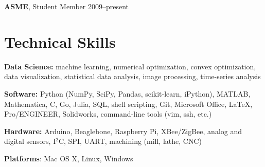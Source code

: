 \documentclass[]{res}
\begin{document}
\begin{resume}
\textbf{ASME}, Student Member \hfill 2009--present


\section{Technical Skills}
\vspace{0.1in}

\textbf{Data Science:} machine learning, numerical optimization, convex
optimization, data visualization, statistical data analysis, image processing,
time-series analysis

\textbf{Software:} Python (NumPy, SciPy, Pandas, scikit-learn, iPython),
MATLAB, Mathematica, C, Go, Julia, SQL, shell scripting, Git, Microsoft Office,
LaTeX, Pro/ENGINEER, Solidworks, command-line tools (vim, ssh, etc.)

\textbf{Hardware:} Arduino, Beaglebone, Raspberry Pi, XBee/ZigBee, analog and
digital sensors, I$^2$C, SPI, UART, machining (mill, lathe, CNC)

\textbf{Platforms}: Mac OS X, Linux, Windows

\end{resume}
\end{document}
